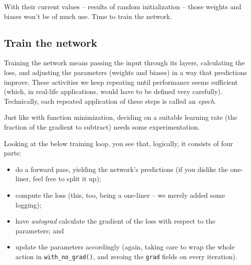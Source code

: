 \documentclass[
  letterpaper,
]{krantz}
\begin{document}
With their current values -- results of random initialization -- those
weights and biases won't be of much use. Time to train the network.

\hypertarget{train-the-network}{%
\subsection{Train the network}\label{train-the-network}}

Training the network means passing the input through its layers,
calculating the loss, and adjusting the parameters
(weights and biases) in a way that predictions improve. These activities
we keep repeating until performance seems sufficient (which, in
real-life applications, would have to be defined very carefully).
Technically, each repeated application of these steps is called an
\emph{epoch}.

Just like with function minimization, deciding on a suitable learning
rate (the fraction of the gradient to subtract) needs some
experimentation.

Looking at the below training loop, you see that, logically, it consists
of four parts:

\begin{itemize}
\item
  do a forward pass, yielding the network's
  predictions (if you dislike the one-liner, feel free to split it up);
\item
  compute the loss (this, too, being a one-liner -- we merely added some
  logging);
\item
  have \emph{autograd} calculate the gradient of the loss with respect
  to the parameters; and
\item
  update the parameters accordingly (again, taking care to wrap the
  whole action in \texttt{with\_no\_grad()}, and zeroing the
  \texttt{grad} fields on every iteration).
\end{itemize}
\end{document}
